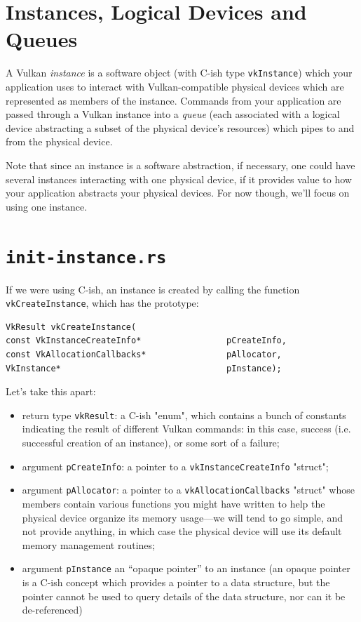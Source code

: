 \documentclass[12pt,letterpaper]{article}
\newcommand{\inquotes}[1]{``#1''}	%
\newcommand{\cil}[1]{\texttt{#1}}
\begin{document}
\section{Instances, Logical Devices and Queues}

A Vulkan \emph{instance} is a software object (with C-ish type \cil{vkInstance}) which your application uses to interact with Vulkan-compatible physical devices which are represented as members of the instance. Commands from your application are passed through a Vulkan instance into a \emph{queue} (each associated with a logical device abstracting a subset of the physical device's resources) which pipes to and from the physical device. 

Note that since an instance is a software abstraction, if necessary, one could have several instances interacting with one physical device, if it provides value to how your application abstracts your physical devices. For now though, we'll focus on using one instance.
	
\section{\texttt{init-instance.rs}}
	
	If we were using C-ish, an instance is created by calling the function \cil{vkCreateInstance}, which has the prototype:
		\begin{verbatim}
VkResult vkCreateInstance(
const VkInstanceCreateInfo*                 pCreateInfo,
const VkAllocationCallbacks*                pAllocator,
VkInstance*                                 pInstance);
		\end{verbatim}
		
	Let's take this apart:
		\begin{itemize}
			\item return type \cil{vkResult}: a C-ish "enum", which contains a bunch of  constants indicating the result of different Vulkan commands: in this case, success (i.e. successful creation of an instance), or some sort of a failure;
			
			\item argument \cil{pCreateInfo}: a pointer to a \cil{vkInstanceCreateInfo} "struct";
			
			\item argument \cil{pAllocator}: a pointer to a \cil{vkAllocationCallbacks} "struct" whose members contain various functions you might have written to help the physical device organize its memory usage---we will tend to go simple, and not provide anything, in which case the physical device will use its default memory management routines;
			
			\item argument \cil{pInstance} an \inquotes{opaque pointer} to an instance (an opaque pointer is a C-ish concept which provides a pointer to a data structure, but the pointer cannot be used to query details of the data structure, nor can it be de-referenced)
		\end{itemize}
	
\end{document}
